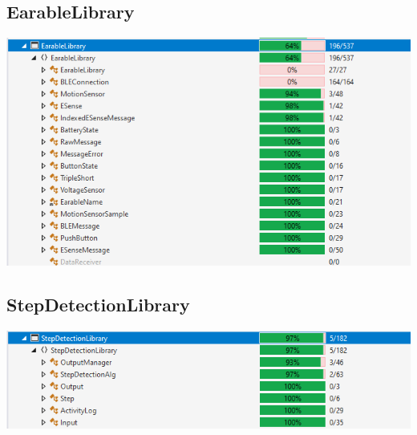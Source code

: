 \documentclass[../validierung.tex]{subfiles}
\begin{document}
	\subsection{EarableLibrary}
		\includegraphics[width=\textwidth]{ear.png}
	\subsection{StepDetectionLibrary}
		\includegraphics[width=\textwidth]{step.png}
\end{document}
